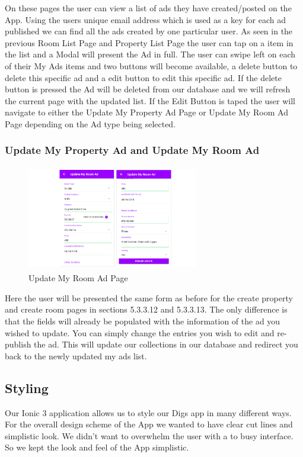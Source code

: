 On these pages the user can view a list of ads they have created/posted on the App. Using the users unique email address which is used as a key for each ad published we can find all the ads created by one particular user. As seen in the previous Room List Page and Property List Page the user can tap on a item in the list and a Modal will present the Ad in full. 
The user can swipe left on each of their My Ads items and two buttons will become available, a delete button to delete this specific ad and a edit button to edit this specific ad. If the delete button is pressed the Ad will be deleted from our database and we will refresh the current page with the updated list. If the Edit Button is taped the user will navigate to either the Update My Property Ad Page or Update My Room Ad Page depending on the Ad type being selected.

\subsubsection{Update My Property Ad and Update My Room Ad}

\begin{figure}[h]
\centering
\includegraphics[width=7.5cm, height=4.6cm]{img/update}
\caption{Update My Room Ad Page}
\end{figure}  

\noindent Here the user will be presented the same form as before for the create property and create room pages in sections 5.3.3.12 and 5.3.3.13. The only difference is that the fields will already be populated with the information of the ad you wished to update. You can simply change the entries you wish to edit and re-publish the ad. This will update our collections in our database and redirect you back to the newly updated my ads list.

\subsection{Styling}

Our Ionic 3 application allows us to style our Digs app in many different ways. For the overall design scheme of the App we wanted to have clear cut lines and simplistic look. We didn’t want to overwhelm the user with a to busy interface. So we kept the look and feel of the App simplistic.\\

